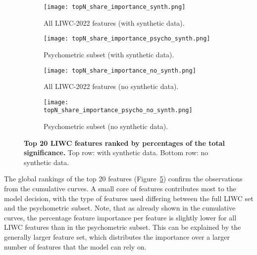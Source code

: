 \begin{figure}[H]
  \centering
  
  \begin{subfigure}[t]{0.49\textwidth}
    \centering
    \texttt{[image: topN\_share\_importance\_synth.png]}
    \caption{All LIWC-2022 features (with synthetic data).}
    \label{fig:synth_all}
  \end{subfigure}\hfill
  \begin{subfigure}[t]{0.49\textwidth}
    \centering
    \texttt{[image: topN\_share\_importance\_psycho\_synth.png]}
    \caption{Psychometric subset (with synthetic data).}
    \label{fig:synth_psycho}
  \end{subfigure}
  
  \vspace{0.5cm}
  

  \begin{subfigure}[t]{0.49\textwidth}
    \centering
    \texttt{[image: topN\_share\_importance\_no\_synth.png]}
    \caption{All LIWC-2022 features (no synthetic data).}
    \label{fig:no_synth_all}
  \end{subfigure}\hfill
  \begin{subfigure}[t]{0.49\textwidth}
    \centering
    \texttt{[image: topN\_share\_importance\_psycho\_no\_synth.png]}
    \caption{Psychometric subset (no synthetic data).}
    \label{fig:no_synth_psycho}
  \end{subfigure}

  \caption[Top 20 LIWC features ranked by percentages of the total significance.]{\textbf{Top 20 LIWC features ranked by percentages of the total significance.} 
  Top row: with synthetic data. Bottom row: no synthetic data.}
  \label{fig:global_feature_importance_combined}
\end{figure}

The global rankings of the top 20 features (Figure~\ref{fig:global_feature_importance_combined}) confirm the observations from the cumulative curves. A small core of features contributes most to the model decision, with the type of features used differing between the full LIWC set and the psychometric subset. Note, that as already shown in the cumulative curves, the percentage feature importance per feature is slightly lower for all LIWC features than in the psychometric subset. This can be explained by the generally larger feature set, which distributes the importance over a larger number of features that the model can rely on.

